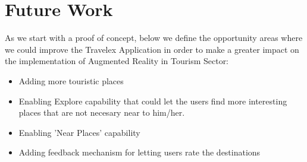 \section{Future Work}
As we start with a proof of concept, below we define the opportunity areas where we 
could improve the Travelex Application in order to make a greater impact on the 
implementation of Augmented Reality in Tourism Sector:\\

\begin{itemize}
  \item Adding more touristic places 
  \item Enabling Explore capability that could let the users find more interesting 
        places that are not necesary near to him/her.
  \item Enabling 'Near Places' capability
  \item Adding feedback mechanism for letting users rate the destinations
\end{itemize}
